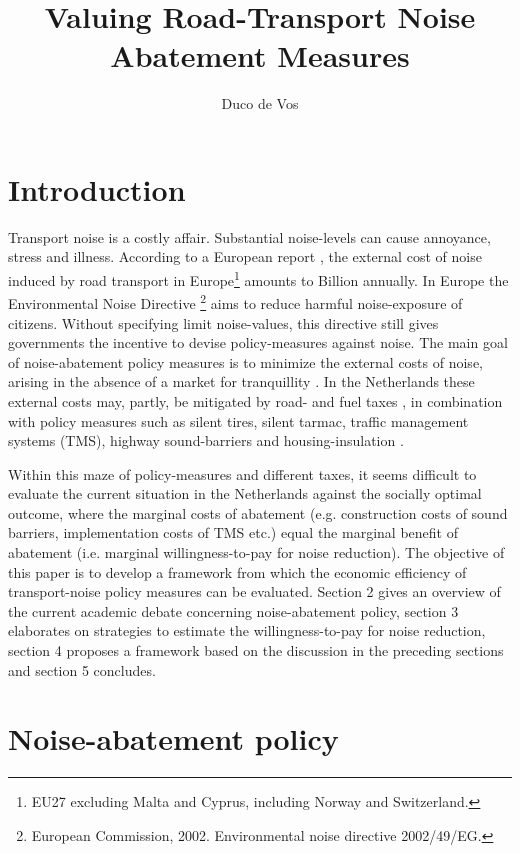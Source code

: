 \documentclass[a4paper]{scrartcl}
\title{Valuing Road-Transport Noise Abatement Measures}
\author{Duco de Vos}
\begin{document}
	
\maketitle
	
\section{Introduction}
	
Transport noise is a costly affair. Substantial noise-levels can cause annoyance, stress and illness.   According to a European report \citep{CEDelft2011}, the external cost of noise induced by road transport in Europe\footnote{EU27 excluding Malta and Cyprus, including Norway and Switzerland.} amounts to  Billion annually. In Europe the Environmental Noise Directive \footnote{European Commission, 2002. Environmental noise directive 2002/49/EG.} aims to reduce harmful noise-exposure of citizens. Without specifying limit noise-values, this directive still gives governments the incentive to devise policy-measures against noise. The main goal of noise-abatement policy measures is to minimize the external costs of noise, arising in the absence of a market for tranquillity \citep{Nelson2008}. In the Netherlands these external costs may, partly, be mitigated by road- and fuel taxes \citep{Andersson2013}, in combination with policy measures such as silent tires, silent tarmac, traffic management systems (TMS), highway sound-barriers and housing-insulation \citep{RIVM2001}.
	
Within this maze of policy-measures and different taxes, it seems difficult to evaluate the current situation in the Netherlands against the socially optimal outcome, where the marginal costs of abatement (e.g. construction costs of sound barriers, implementation costs of TMS etc.) equal the marginal benefit of abatement (i.e. marginal willingness-to-pay for noise reduction). The objective of this paper is to develop a framework from which the economic efficiency of transport-noise policy measures can be evaluated. Section 2 gives an overview of the current academic debate concerning noise-abatement policy, section 3 elaborates on strategies to estimate the willingness-to-pay for noise reduction, section 4 proposes a framework based on the discussion in the preceding sections and section 5 concludes.
	
\section{Noise-abatement policy}
\end{document}
